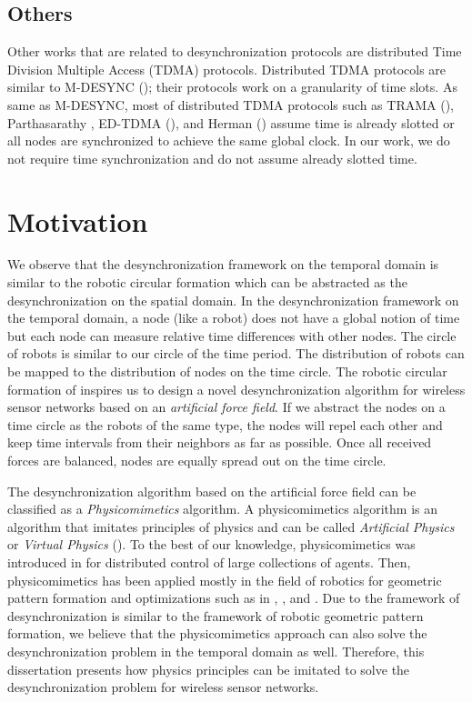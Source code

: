 \subsection{Others}
\label{sec:tdma}
Other works that are related to desynchronization protocols are distributed Time Division Multiple Access (TDMA) protocols. Distributed TDMA protocols are similar to M-DESYNC (\cite{5062256}); their protocols work on a granularity of time slots. 
As same as M-DESYNC, most of distributed TDMA protocols such as TRAMA (\cite{trama}), Parthasarathy \cite{Parthasarathy}, ED-TDMA (\cite{edtdma}), and Herman (\cite{herman}) assume time is already slotted or all nodes are synchronized to achieve the same global clock. 
In our work, we do not require time synchronization and do not assume already slotted time.

\section{Motivation}
\label{sec:motivation}
We observe that the desynchronization framework on the temporal domain is similar to the robotic circular formation which can be abstracted as the desynchronization on the spatial domain.
In the desynchronization framework on the temporal domain, a node (like a robot) does not have a global notion of time but each node can measure relative time differences with other nodes.
The circle of robots is similar to our circle of the time period. 
The distribution of robots can be mapped to the distribution of nodes on the time circle. 
The robotic circular formation of \cite{4141997} inspires us to design a novel desynchronization algorithm for wireless sensor networks based on an \textit{artificial force field}.
If we abstract the nodes on a time circle as the robots of the same type, the nodes will repel each other and keep time intervals from their neighbors as far as possible.
Once all received forces are balanced, nodes are equally spread out on the time circle.

The desynchronization algorithm based on the artificial force field can be classified as a \textit{Physicomimetics} algorithm.
A physicomimetics algorithm is an algorithm that imitates principles of physics and can be called \textit{Artificial Physics} or \textit{Virtual Physics} (\cite{physicomimetics}). To the best of our knowledge, physicomimetics was introduced in \cite{810278} for distributed control of large collections of agents. Then, physicomimetics has been applied mostly in the field of robotics for geometric pattern formation and optimizations such as in \cite{swarm}, \cite{artphysics}, and \cite{4141997}.
Due to the framework of desynchronization is similar to the framework of robotic geometric pattern formation, we believe that the physicomimetics approach can also solve the desynchronization problem in the temporal domain as well. 
Therefore, this dissertation presents how physics principles can be imitated to solve the desynchronization problem for wireless sensor networks.
